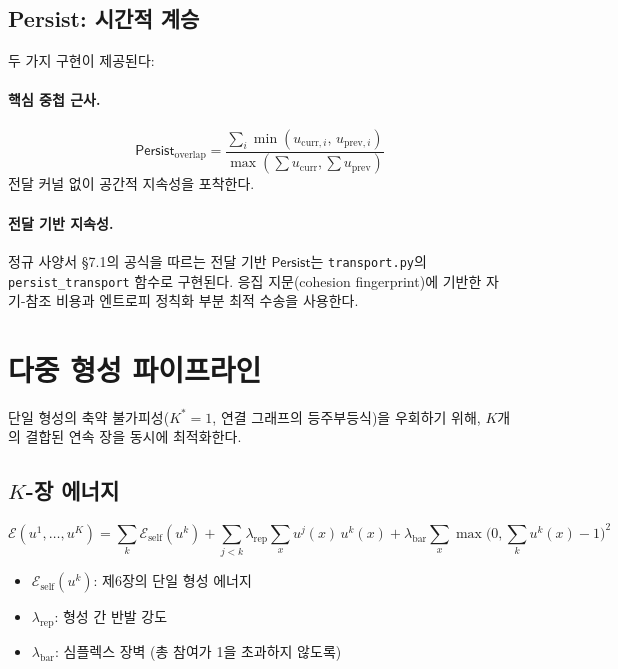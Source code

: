 \subsection{Persist: 시간적 계승}

두 가지 구현이 제공된다:

\paragraph{핵심 중첩 근사.}
\begin{equation}
    \mathsf{Persist}_{\mathrm{overlap}} = \frac{\sum_i \min(u_{\mathrm{curr},i}, \, u_{\mathrm{prev},i})}{\max(\sum u_{\mathrm{curr}}, \sum u_{\mathrm{prev}})}
\end{equation}
전달 커널 없이 공간적 지속성을 포착한다.

\paragraph{전달 기반 지속성.}
정규 사양서 \S7.1의 공식을 따르는 전달 기반 $\mathsf{Persist}$는 \texttt{transport.py}의 \texttt{persist\_transport} 함수로 구현된다. 응집 지문(cohesion fingerprint)에 기반한 자기-참조 비용과 엔트로피 정칙화 부분 최적 수송을 사용한다.


\section{다중 형성 파이프라인}
\label{sec:multi-impl}

단일 형성의 축약 불가피성($K^* = 1$, 연결 그래프의 등주부등식)을 우회하기 위해, $K$개의 결합된 연속 장을 동시에 최적화한다.

\subsection{$K$-장 에너지}

\begin{equation}
    \mathcal{E}(u^1, \ldots, u^K) = \sum_k \mathcal{E}_{\mathrm{self}}(u^k) + \sum_{j<k} \lambda_{\mathrm{rep}} \sum_x u^j(x) \, u^k(x) + \lambda_{\mathrm{bar}} \sum_x \max\!\bigl(0, \textstyle\sum_k u^k(x) - 1\bigr)^2
\end{equation}

\begin{itemize}
    \item $\mathcal{E}_{\mathrm{self}}(u^k)$: 제6장의 단일 형성 에너지
    \item $\lambda_{\mathrm{rep}}$: 형성 간 반발 강도
    \item $\lambda_{\mathrm{bar}}$: 심플렉스 장벽 (총 참여가 1을 초과하지 않도록)
\end{itemize}

